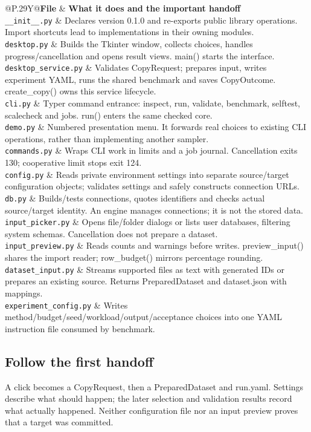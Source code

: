 \documentclass[11pt,a4paper]{article}
\makeatletter
\newcommand{\filemap}[1]{\begingroup\small\par\noindent\begin{tabularx}{\linewidth}{@{}P{.29\linewidth}Y@{}}\toprule\textbf{File} & \textbf{What it does and the important handoff}\\\midrule #1\bottomrule\end{tabularx}\par\endgroup}
\makeatother
\begin{document}
\filemap{
\texttt{\_\_init\_\_.py} & Declares version 0.1.0 and re-exports public library operations. Import shortcuts lead to implementations in their owning modules.\\[7pt]
\texttt{desktop.py} & Builds the Tkinter window, collects choices, handles progress/cancellation and opens result views. main() starts the interface.\\[7pt]
\texttt{desktop\_service.py} & Validates CopyRequest; prepares input, writes experiment YAML, runs the shared benchmark and saves CopyOutcome. create\_copy() owns this service lifecycle.\\[7pt]
\texttt{cli.py} & Typer command entrance: inspect, run, validate, benchmark, selftest, scalecheck and jobs. run() enters the same checked core.\\[7pt]
\texttt{demo.py} & Numbered presentation menu. It forwards real choices to existing CLI operations, rather than implementing another sampler.\\[7pt]
\texttt{commands.py} & Wraps CLI work in limits and a job journal. Cancellation exits 130; cooperative limit stops exit 124.\\[7pt]
\texttt{config.py} & Reads private environment settings into separate source/target configuration objects; validates settings and safely constructs connection URLs.\\[7pt]
\texttt{db.py} & Builds/tests connections, quotes identifiers and checks actual source/target identity. An engine manages connections; it is not the stored data.\\[7pt]
\texttt{input\_picker.py} & Opens file/folder dialogs or lists user databases, filtering system schemas. Cancellation does not prepare a dataset.\\[7pt]
\texttt{input\_preview.py} & Reads counts and warnings before writes. preview\_input() shares the import reader; row\_budget() mirrors percentage rounding.\\[7pt]
\texttt{dataset\_input.py} & Streams supported files as text with generated IDs or prepares an existing source. Returns PreparedDataset and dataset.json with mappings.\\[7pt]
\texttt{experiment\_config.py} & Writes method/budget/seed/workload/output/acceptance choices into one YAML instruction file consumed by benchmark.\\[5pt]
}

\subsection*{Follow the first handoff}
A click becomes a CopyRequest, then a PreparedDataset and run.yaml. Settings describe what should happen; the later selection and validation results record what actually happened. Neither configuration file nor an input preview proves that a target was committed.
\end{document}
